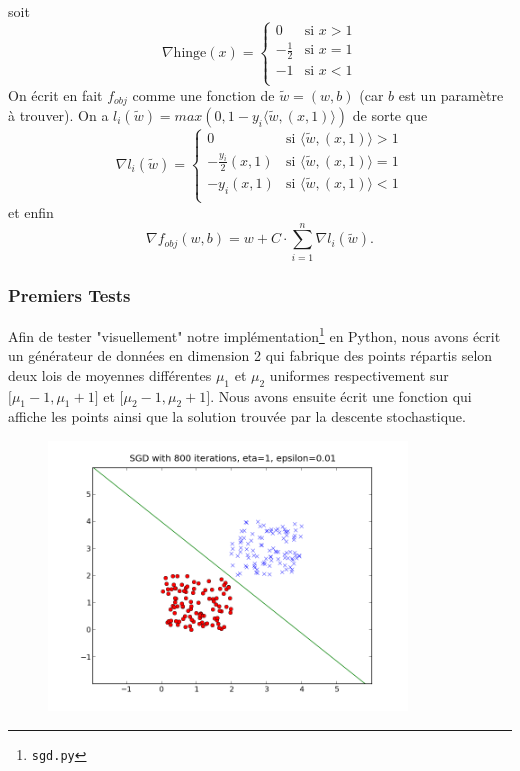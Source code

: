 \documentclass{article}
\begin{document}
 soit 
\[ \nabla \mathrm{hinge}(x) = \begin{cases} 0 &\mbox{si } x>1 \\
-\frac{1}{2} & \mbox{si } x=1\\
-1 & \mbox{si } x<1\\
 \end{cases}\]
On écrit en fait $f_{obj}$ comme une fonction de $\tilde{w} = (w,b)$ (car $b$ est un paramètre à trouver).
On a $l_i (\tilde{w}) = max(0, 1 - y_i \langle \tilde{w} , (x,1) \rangle)$ de sorte que
\[ \nabla l_i(\tilde{w}) = \begin{cases} 0 &\mbox{si } \langle \tilde{w}, (x,1) \rangle >1 \\
-\frac{y_i}{2} (x,1) & \mbox{si } \langle \tilde{w}, (x,1) \rangle=1\\
-y_i (x,1) & \mbox{si } \langle \tilde{w}, (x,1) \rangle<1\\
 \end{cases}\]
 et enfin
 \[ \nabla f_{obj}(w,b) = w + C \cdot \displaystyle\sum\limits_{i=1}^{n} \nabla l_i(\tilde{w}). \]

\subsubsection{Premiers Tests}
\label{donnees}
Afin de tester "visuellement" notre implémentation\footnote{\texttt{sgd.py}} en Python, nous avons écrit un générateur de données en dimension 2 qui fabrique des points répartis selon deux lois de moyennes différentes $\mu_1$ et $\mu_2$ uniformes respectivement sur $\lbrack \mu_1 - 1, \mu_1 + 1\rbrack$ et $\lbrack \mu_2 - 1, \mu_2 + 1\rbrack$.
Nous avons ensuite écrit une fonction qui affiche les points ainsi que la solution trouvée par la descente stochastique.

\begin{figure}[!h]
\includegraphics[width=0.85\textwidth]{../SGD}
\end{figure}
\end{document}
